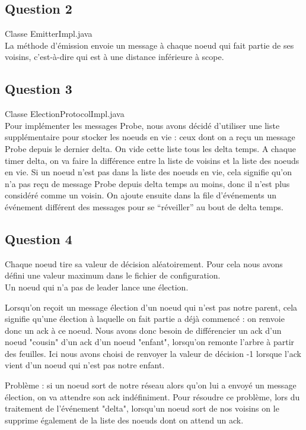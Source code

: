 \documentclass[paper=a4, fontsize=11pt]{article} %
\begin{document}
\subsection{Question 2}
Classe EmitterImpl.java\\
La méthode d'émission envoie un message à chaque noeud qui fait partie de ses voisins, c'est-à-dire qui est à une distance inférieure à scope.

\subsection{Question 3}
Classe ElectionProtocolImpl.java \\
Pour implémenter les messages Probe, nous avons décidé d'utiliser une liste supplémentaire pour stocker les noeuds en vie : ceux dont on a reçu un message Probe depuis le dernier delta. On vide cette liste tous les delta temps.
A chaque timer delta, on va faire la différence entre la liste de voisins et la liste des noeuds en vie. Si un noeud n'est pas dans la liste des noeuds en vie, cela signifie qu'on n'a pas reçu de message Probe depuis delta temps au moins, donc il n'est plus considéré comme un voisin.
On ajoute ensuite dans la file d'événements un événement différent des messages pour se \enquote{réveiller} au bout de delta temps.


\subsection{Question 4}
Chaque noeud tire sa valeur de décision aléatoirement. Pour cela nous avons défini une valeur maximum dans le fichier de configuration.\\
Un noeud qui n'a pas de leader lance une élection.

Lorsqu'on reçoit un message élection d'un noeud qui n'est pas notre parent, cela signifie qu'une élection à laquelle on fait partie a déjà commencé : on renvoie donc un ack à ce noeud.
Nous avons donc besoin de différencier un ack d'un noeud "cousin" d'un ack d'un noeud "enfant", lorsqu'on remonte l'arbre à partir des feuilles.
Ici nous avons choisi de renvoyer la valeur de décision -1 lorsque l'ack vient d'un noeud qui n'est pas notre enfant. 

Problème : si un noeud sort de notre réseau alors qu'on lui a envoyé un message élection, on va attendre son ack indéfiniment. 
Pour résoudre ce problème, lors du traitement de l'événement "delta", lorsqu'un noeud sort de nos voisins on le supprime également de la liste des noeuds dont on attend un ack.
\end{document}
